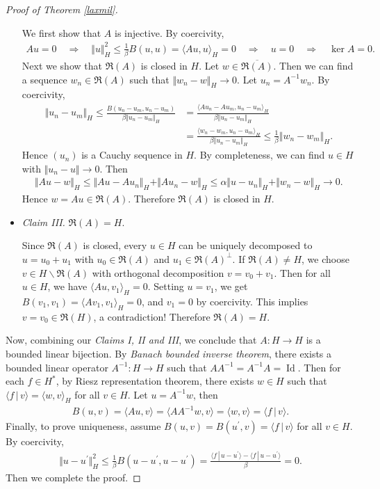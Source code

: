 \documentclass{article}
\numberwithin{equation}{section}
\newcommand{\ol}{\overline}
\DeclareMathOperator{\id}{Id}
\theoremstyle{plain}
\theoremstyle{definition}
\begin{document}
\begin{proof}[Proof of Theorem \ref{laxmil}]
\begin{itemize}
We first show that $A$ is injective. By coercivity,
\begin{align*}
	Au=0\quad\Rightarrow\quad\Vert u\Vert_H^2\leq\frac{1}{\beta}B(u,u)=\langle Au,u\rangle_H=0\quad\Rightarrow\quad u=0\quad\Rightarrow\quad \ker A=0.
\end{align*}
Next we show that $\mathfrak{R}(A)$ is closed in $H$. Let $w\in\ol{\mathfrak{R}(A)}$. Then we can find a sequence $w_n\in\mathfrak{R}(A)$ such that $\Vert w_n-w\Vert_H\to 0$. Let $u_n=A^{-1}w_n$. By coercivity,
\begin{align*}
	\Vert u_n-u_m\Vert_H\leq\frac{B(u_n-u_m,u_n-u_m)}{\beta\Vert u_n-u_m\Vert_H}&=\frac{\langle Au_n-Au_m,u_n-u_m\rangle_H}{\beta\Vert u_n-u_m\Vert_H}\\
	&=\frac{\langle w_n-w_m,u_n-u_m\rangle_H}{\beta\Vert u_n-u_m\Vert_H}\leq\frac{1}{\beta}\Vert w_n-w_m\Vert_H.
\end{align*}
Hence $(u_n)$ is a Cauchy sequence in $H$. By completeness, we can find $u\in H$ with $\Vert u_n-u\Vert\to 0$. Then
\begin{align*}
	\Vert Au-w\Vert_H\leq\Vert Au-Au_n\Vert_H+\Vert Au_n-w\Vert_H\leq\alpha\Vert u-u_n\Vert_H+\Vert w_n-w\Vert_H\to 0.
\end{align*}
Hence $w=Au\in\mathfrak{R}(A)$. Therefore $\mathfrak{R}(A)$ is closed in $H$.
\item\textit{Claim III.} $\mathfrak{R}(A)=H$.

Since $\mathfrak{R}(A)$ is closed, every $u\in H$ can be uniquely decomposed to $u=u_0+u_1$ with $u_0\in\mathfrak{R}(A)$ and $u_1\in\mathfrak{R}(A)^\perp$. If $\mathfrak{R}(A)\neq H$, we choose $v\in H\backslash\mathfrak{R}(A)$ with orthogonal decomposition $v=v_0+v_1$. Then for all $u\in H$, we have $\langle Au,v_1\rangle_H=0$. Setting $u=v_1$, we get $B(v_1,v_1)=\langle Av_1,v_1\rangle_H=0$, and $v_1=0$ by coercivity. This implies $v=v_0\in\mathfrak{R}(H)$, a contradiction! Therefore $\mathfrak{R}(A)=H$.
\end{itemize}
Now, combining our \textit{Claims I, II and III}, we conclude that $A:H\to H$ is a bounded linear bijection. By \textit{Banach bounded inverse theorem}, there exists a bounded linear operator $A^{-1}:H\to H$ such that $AA^{-1}=A^{-1}A=\id$. Then for each $f\in H^*$, by Riesz representation theorem, there exists $w\in H$ such that $\langle f\,|\,v\rangle=\langle w,v\rangle_H$ for all $v\in H$. Let $u=A^{-1}w$, then
\begin{align*}
	B(u,v)=\langle Au,v\rangle=\langle AA^{-1}w,v\rangle=\langle w,v\rangle=\langle f\,|\,v\rangle.
\end{align*}
Finally, to prove uniqueness, assume $B(u,v)=B(u^\prime,v)=\langle f\,|\,v\rangle$ for all $v\in H$. By coercivity,
\begin{align*}
	\Vert u-u^\prime\Vert_H^2\leq\frac{1}{\beta}B(u-u^\prime,u-u^\prime)=\frac{\langle f\,|\,u-u^\prime\rangle-\langle f\,|\,u-u^\prime\rangle}{\beta}=0.
\end{align*}
Then we complete the proof.
\end{proof}
\end{document}

